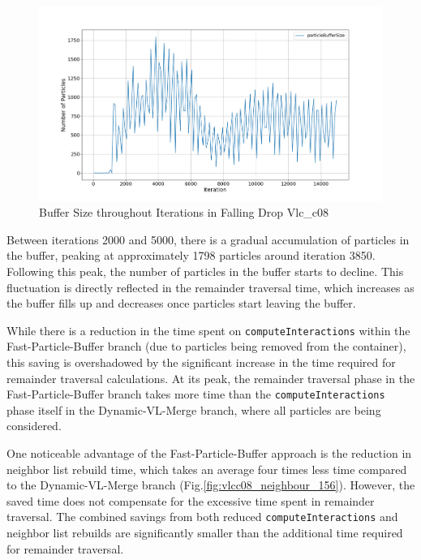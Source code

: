 \begin{figure}[htbp]
    \centering
        \includegraphics[width=\linewidth]{graphs/fallingDrop/normalExperiments/freq/vlcc08_buffer_size_156.png}
        \vspace{-0.5em}

        \caption{Buffer Size throughout Iterations in Falling Drop Vlc\_c08}
        \label{fig:vlcc08_buffer_size_156}
\end{figure}



Between iterations 2000 and 5000, there is a gradual accumulation of particles in the buffer, peaking at approximately 1798 particles around iteration 3850. Following this peak, the number of particles in the buffer starts to decline. This fluctuation is directly reflected in the remainder traversal time, which increases as the buffer fills up and decreases once particles start leaving the buffer. 

While there is a reduction in the time spent on \texttt{computeInteractions} within the Fast-Particle-Buffer branch (due to particles being removed from the container), this saving is overshadowed by the significant increase in the time required for remainder traversal calculations. At its peak, the remainder traversal phase in the Fast-Particle-Buffer branch takes more time than the \texttt{computeInteractions} phase itself in the Dynamic-VL-Merge branch, where all particles are being considered. 

One noticeable advantage of the Fast-Particle-Buffer approach is the reduction in neighbor list rebuild time, which takes an average four times less time compared to the Dynamic-VL-Merge branch (Fig.\ref{fig:vlcc08_neighbour_156}). However, the saved time does not compensate for the excessive time spent in remainder traversal. The combined savings from both reduced \texttt{computeInteractions} and neighbor list rebuilds are significantly smaller than the additional time required for remainder traversal.

